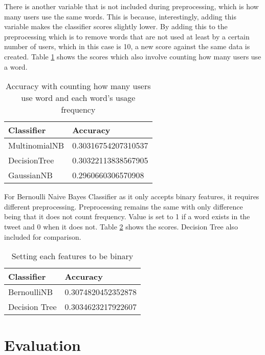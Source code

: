 \documentclass[11pt]{article}
\begin{document}
\noindent
There is another variable that is not included during preprocessing, which is how many
users use the same words. This is because, interestingly, adding this variable
makes the classifier scores slightly
lower. By adding this to the
preprocessing which is to remove words that are not used at least by a certain
number of users, which in this case is 10, a new score against the same data is
created. Table \ref{table2} shows the scores which also involve
counting how many users use a word. 

\begin{table}[h]
  \begin{center}
    \begin{tabular}{|l|l|}

      \hline
      Classifier & Accuracy\\
      \hline
      MultinomialNB & 0.30316754207310537\\
      DecisionTree & 0.30322113838567905\\
      GaussianNB  & 0.2960660306570908\\
      \hline
   \end{tabular}
   \caption{Accuracy with counting how many users use word and each word's usage frequency}\label{table2}
 \end{center}
\end{table}

\noindent
For Bernoulli Naive Bayes Classifier as it only accepts binary features, it
requires different preprocessing. Preprocessing remains the same with
only difference being that it does not count frequency. Value is set to 1 if a
word exists in the tweet and 0 when it does not. Table \ref{table3} shows the
scores. Decision Tree also included for comparison.

\begin{table}[h]
  \begin{center}
    \begin{tabular}{|l|l|}

      \hline
      Classifier & Accuracy\\
      \hline
      BernoulliNB & 0.3074820452352878\\
      Decision Tree & 0.3034623217922607\\
      \hline
   \end{tabular}
   \caption{Setting each features to be binary}\label{table3}
 \end{center}
\end{table}

\section{Evaluation}
\end{document}
